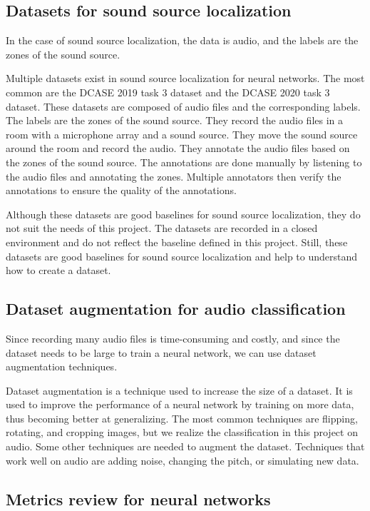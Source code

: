 \subsection{Datasets for sound source localization}
\label{sec:datasetsSSL}

In the case of sound source localization, the data is audio, and the labels are the zones of the sound source. 

Multiple datasets exist in sound source localization for neural networks. The most common are the DCASE 2019 task 3 dataset\cite{Adavanne2019_DCASE} and the DCASE 2020 task 3 dataset\cite{politis2020dataset}. These datasets are composed of audio files and the corresponding labels. The labels are the zones of the sound source. They record the audio files in a room with a microphone array and a sound source. They move the sound source around the room and record the audio. They annotate the audio files based on the zones of the sound source. The annotations are done manually by listening to the audio files and annotating the zones. Multiple annotators then verify the annotations to ensure the quality of the annotations. 

Although these datasets are good baselines for sound source localization, they do not suit the needs of this project. The datasets are recorded in a closed environment and do not reflect the baseline defined in this project. Still, these datasets are good baselines for sound source localization and help to understand how to create a dataset.

\subsection{Dataset augmentation for audio classification}
Since recording many audio files is time-consuming and costly, and since the dataset needs to be large to train a neural network, we can use dataset augmentation techniques.

Dataset augmentation is a technique used to increase the size of a dataset. It is used to improve the performance of a neural network by training on more data, thus becoming better at generalizing. The most common techniques\cite{yang2022image} are flipping, rotating, and cropping images, but we realize the classification in this project on audio. Some other techniques are needed to augment the dataset. Techniques that work well on audio are adding noise, changing the pitch, or simulating new data\cite{ghilardi2019automatic}. 

\subsection{Metrics review for neural networks}

